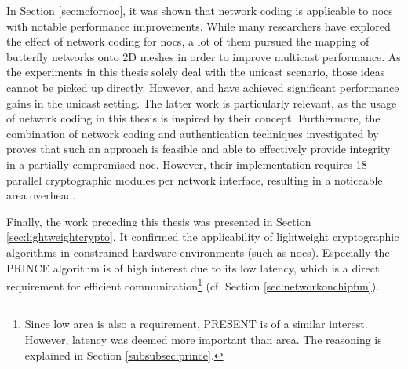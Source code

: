 In Section \ref{sec:ncfornoc}, it was shown that network coding is applicable to \glspl{noc} with notable performance improvements. While many
researchers have explored the effect of network coding for \glspl{noc}, a lot of them pursued the mapping of butterfly networks onto 2D meshes in
order to improve multicast performance. As the experiments in this thesis solely deal with the unicast scenario, those ideas cannot be picked up
directly. However, \citeauthor{duongba11ncinmulticore} \cite{duongba11ncinmulticore} and \citeauthor{moriam15manycorenc} \cite{moriam15manycorenc}
have achieved significant performance gains in the unicast setting. The latter work is particularly relevant, as the usage of network coding in this
thesis is inspired by their concept. Furthermore, the combination of network coding and authentication techniques investigated by
\citeauthor{moriam18activeattackers} \cite{moriam18activeattackers} proves that such an approach is feasible and able to effectively provide integrity
in a partially compromised \gls{noc}. However, their implementation requires 18 parallel cryptographic modules per network interface, resulting in a
noticeable area overhead.

Finally, the work preceding this thesis was presented in Section \ref{sec:lightweightcrypto}. It confirmed the applicability of lightweight
cryptographic algorithms in constrained hardware environments (such as \glspl{noc}). Especially the PRINCE algorithm is of high interest due to its
low latency, which is a direct requirement for efficient communication\footnote{Since low area is also a requirement, PRESENT is of a similar
interest. However, latency was deemed more important than area. The reasoning is explained in Section \ref{subsubsec:prince}.} (cf. Section
\ref{sec:networkonchipfun}).
